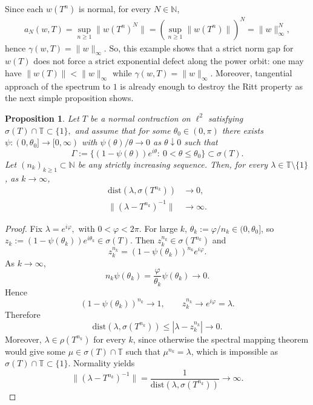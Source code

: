 \documentclass[11pt]{amsart}
\numberwithin{equation}{section}
\newtheorem{proposition}[theorem]{Proposition}
\theoremstyle{definition}
\theoremstyle{plain}
\def\T{\mathbb{T}}
\def\dist{\mathrm{dist}}
\begin{document}
Since each \(w(T^n)\) is normal, for every \(N\in \mathbb N\),
\[
\begin{aligned}
   a_N(w,T)
   =
   \sup_{n\ge1}\|w(T^n)^N\|
   =
   \left(\sup_{n\ge1}\|w(T^n)\|\right)^N
   =
   \|w\|_\infty^N,
\end{aligned}
\]
hence \(\gamma(w,T)=\|w\|_\infty\).
So, this example shows that a strict norm gap for \(w(T)\) does not force
a strict exponential defect along the power orbit: one may have
\(\|w(T)\|<\|w\|_\infty\) while
\(\gamma(w,T)=\|w\|_\infty\).
Moreover, tangential approach of the spectrum to \(1\) is already
enough to destroy the Ritt property
as the next simple proposition shows.

\begin{proposition}
\label{lem:curve_kills_subsequence}
Let \(T\) be a normal contraction on $\ell^2$ satisfying
\(
        \sigma(T)\cap\T\subset\{1\},
\)
and
 assume that for some $\theta_0\in(0,\pi)$ there exists
$\psi:(0,\theta_0]\to[0,\infty)$ with $\psi(\theta)/\theta\to0$ as $\theta\downarrow0$ such that
\[
\Gamma:=\{(1-\psi(\theta))e^{i\theta}:\ 0<\theta\le\theta_0\}\subset\sigma(T).
\]
Let $(n_k)_{k \ge 1}\subset \mathbb N$ be any strictly increasing sequence.
Then, for every \(\lambda\in\T\setminus\{1\}\), as \(k\to\infty\),
\[
\begin{aligned}
\dist(\lambda,\sigma(T^{n_k}))&\longrightarrow0,\\
\|(\lambda-T^{n_k})^{-1}\|&\longrightarrow\infty.
\end{aligned}
\]
\end{proposition}

\begin{proof}
Fix $\lambda=e^{i\varphi},$ with \(0<\varphi<2\pi\).
For large $k$, $\theta_k:=\varphi/n_k\in(0,\theta_0]$, so $z_k:=(1-\psi(\theta_k))e^{i\theta_k}\in\sigma(T)$.
Then $z_k^{n_k}\in\sigma(T^{n_k})$ and
\[
z_k^{n_k}=(1-\psi(\theta_k))^{n_k}e^{i\varphi}.
\]
As \(k\to\infty\),
\[
        n_k\psi(\theta_k)
        =
        \frac{\varphi}{\theta_k}\psi(\theta_k)
        \longrightarrow0.
\]
Hence
\[
        (1-\psi(\theta_k))^{n_k}\longrightarrow1,
        \qquad
        z_k^{n_k}\longrightarrow e^{i\varphi}=\lambda.
\]
Therefore
\[
        \dist(\lambda,\sigma(T^{n_k}))
        \le
        |\lambda-z_k^{n_k}|
        \longrightarrow0.
\]
Moreover, \(\lambda\in\rho(T^{n_k})\) for every \(k\), since otherwise
the spectral mapping theorem would give some
\(\mu\in\sigma(T)\cap\mathbb T\) such that
\(\mu^{n_k}=\lambda\), which is impossible as
\(\sigma(T)\cap\mathbb T\subset\{1\}\).
Normality yields
\[
        \|(\lambda-T^{n_k})^{-1}\|
        =
        \frac1{\dist(\lambda,\sigma(T^{n_k}))}
        \longrightarrow\infty.
\]
\end{proof}
\end{document}

